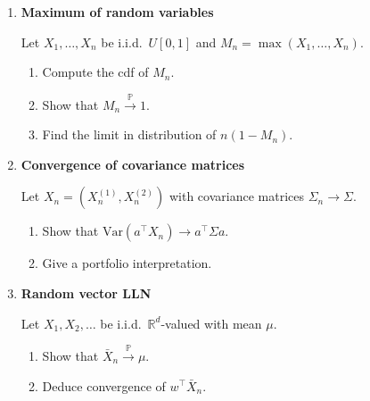 \documentclass[11pt]{article}
\begin{document}
\begin{enumerate}
\begin{enumerate}
\item State the CLT.
\item Show that $\frac{X_n}{\sigma}\xrightarrow{d}\mathcal{N}(0,1)$.
\item Deduce the limit of $X_n/\hat\sigma_n$ where $\hat\sigma_n\to\sigma$ in probability.
\end{enumerate}

\bigskip

\item \textbf{Maximum of random variables}

Let $X_1,\dots,X_n$ be i.i.d.\ $U[0,1]$ and $M_n=\max(X_1,\dots,X_n)$.

\begin{enumerate}
\item Compute the cdf of $M_n$.
\item Show that $M_n\xrightarrow{\mathbb{P}}1$.
\item Find the limit in distribution of $n(1-M_n)$.
\end{enumerate}

\bigskip

\item \textbf{Convergence of covariance matrices}

Let $X_n=(X_n^{(1)},X_n^{(2)})$ with covariance matrices $\Sigma_n\to\Sigma$.

\begin{enumerate}
\item Show that $\mathrm{Var}(a^\top X_n)\to a^\top\Sigma a$.
\item Give a portfolio interpretation.
\end{enumerate}

\bigskip

\item \textbf{Random vector LLN}

Let $X_1,X_2,\dots$ be i.i.d.\ $\mathbb{R}^d$-valued with mean $\mu$.

\begin{enumerate}
\item Show that $\bar X_n\xrightarrow{\mathbb{P}}\mu$.
\item Deduce convergence of $w^\top \bar X_n$.
\end{enumerate}

\bigskip


\end{enumerate}
\end{document}
